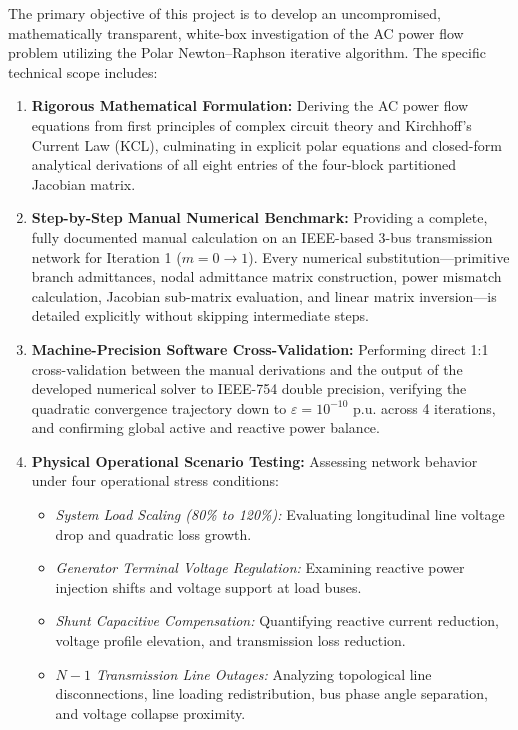 \documentclass[12pt,a4paper,oneside]{report}
\begin{document}
The primary objective of this project is to develop an uncompromised, mathematically transparent, white-box investigation of the AC power flow problem utilizing the Polar Newton--Raphson iterative algorithm. The specific technical scope includes:
\begin{enumerate}
    \item \textbf{Rigorous Mathematical Formulation:} Deriving the AC power flow equations from first principles of complex circuit theory and Kirchhoff's Current Law (KCL), culminating in explicit polar equations and closed-form analytical derivations of all eight entries of the four-block partitioned Jacobian matrix.
    \item \textbf{Step-by-Step Manual Numerical Benchmark:} Providing a complete, fully documented manual calculation on an IEEE-based 3-bus transmission network for Iteration 1 ($m = 0 \to 1$). Every numerical substitution---primitive branch admittances, nodal admittance matrix construction, power mismatch calculation, Jacobian sub-matrix evaluation, and linear matrix inversion---is detailed explicitly without skipping intermediate steps.
    \item \textbf{Machine-Precision Software Cross-Validation:} Performing direct 1:1 cross-validation between the manual derivations and the output of the developed numerical solver to IEEE-754 double precision, verifying the quadratic convergence trajectory down to $\varepsilon = 10^{-10}\text{ p.u.}$ across 4 iterations, and confirming global active and reactive power balance.
    \item \textbf{Physical Operational Scenario Testing:} Assessing network behavior under four operational stress conditions:
    \begin{itemize}
        \item \textit{System Load Scaling (80\% to 120\%):} Evaluating longitudinal line voltage drop and quadratic loss growth.
        \item \textit{Generator Terminal Voltage Regulation:} Examining reactive power injection shifts and voltage support at load buses.
        \item \textit{Shunt Capacitive Compensation:} Quantifying reactive current reduction, voltage profile elevation, and transmission loss reduction.
        \item \textit{$N-1$ Transmission Line Outages:} Analyzing topological line disconnections, line loading redistribution, bus phase angle separation, and voltage collapse proximity.
    \end{itemize}
\end{enumerate}
\end{document}
